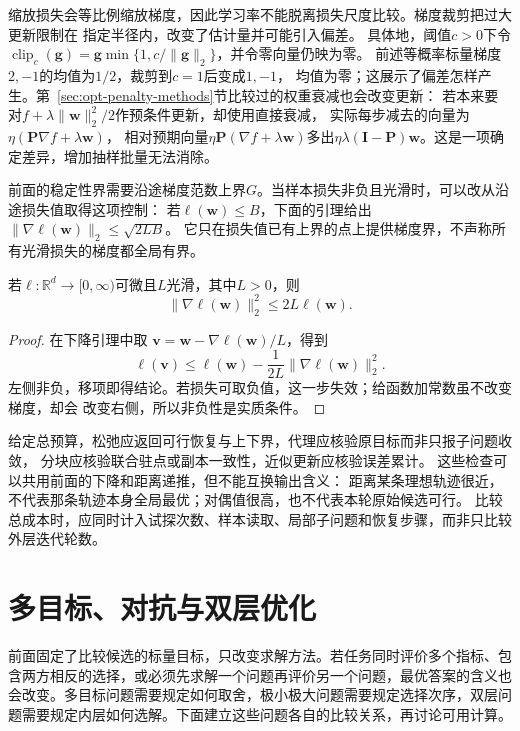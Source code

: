 缩放损失会等比例缩放梯度，因此学习率不能脱离损失尺度比较。梯度裁剪把过大更新限制在
指定半径内，改变了估计量并可能引入偏差。
具体地，阈值$c>0$下令
$\operatorname{clip}_c(\bm g)=\bm g\min\{1,c/\|\bm g\|_2\}$，并令零向量仍映为零。
前述等概率标量梯度$2,-1$的均值为$1/2$，裁剪到$c=1$后变成$1,-1$，
均值为零；这展示了偏差怎样产生。第~\ref{sec:opt-penalty-methods}节比较过的权重衰减也会改变更新：
若本来要对$f+\lambda\|\bm w\|_2^2/2$作预条件更新，却使用直接衰减，
实际每步减去的向量为$\eta(\bm P\nabla f+\lambda\bm w)$，
相对预期向量$\eta\bm P(\nabla f+\lambda\bm w)$多出$\eta\lambda(\bm I-\bm P)\bm w$。这是一项确定差异，增加抽样批量无法消除。

前面的稳定性界需要沿途梯度范数上界$G$。当样本损失非负且光滑时，可以改从沿途损失值取得这项控制：
若$\ell(\bm w)\leq B$，下面的引理给出$\|\nabla\ell(\bm w)\|_2\leq\sqrt{2LB}$。
它只在损失值已有上界的点上提供梯度界，不声称所有光滑损失的梯度都全局有界。

\begin{lemma}[非负光滑函数的梯度自界]
\label{lem:opt-self-bounding}
若$\ell:\mathbb{R}^d\to[0,\infty)$可微且$L$光滑，其中$L>0$，则
\[
  \lVert\nabla\ell(\bm{w})\rVert_2^2\leq2L\ell(\bm{w}).
\]
\end{lemma}

\begin{proof}
在下降引理中取
$\bm{v}=\bm{w}-\nabla\ell(\bm{w})/L$，得到
\[
  \ell(\bm{v})
  \leq\ell(\bm{w})-\frac{1}{2L}
  \lVert\nabla\ell(\bm{w})\rVert_2^2.
\]
左侧非负，移项即得结论。若损失可取负值，这一步失效；给函数加常数虽不改变梯度，却会
改变右侧，所以非负性是实质条件。
\end{proof}

给定总预算，松弛应返回可行恢复与上下界，代理应核验原目标而非只报子问题收敛，
分块应核验联合驻点或副本一致性，近似更新应核验误差累计。
这些检查可以共用前面的下降和距离递推，但不能互换输出含义：
距离某条理想轨迹很近，不代表那条轨迹本身全局最优；对偶值很高，也不代表本轮原始候选可行。
比较总成本时，应同时计入试探次数、样本读取、局部子问题和恢复步骤，而非只比较外层迭代轮数。

\section{多目标、对抗与双层优化}
\label{sec:opt-decomposition-multiple-levels}

前面固定了比较候选的标量目标，只改变求解方法。若任务同时评价多个指标、包含两方相反的选择，或必须先求解一个问题再评价另一个问题，最优答案的含义也会改变。多目标问题需要规定如何取舍，极小极大问题需要规定选择次序，双层问题需要规定内层如何选解。下面建立这些问题各自的比较关系，再讨论可用计算。

